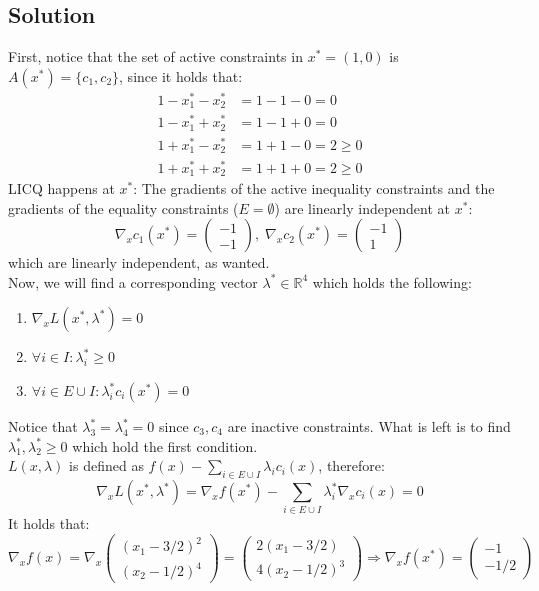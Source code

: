 \documentclass{article}
\begin{document}
\subsection*{Solution}
First, notice that the set of active constraints in $x^* = (1,0)$ is $A(x^*)=\{c_1 , c_2\}$, since it holds that:
\begin{align*}
    1-x^*_1 -x^*_2 &= 1-1-0 =0 \\ 1-x^*_1 +x^*_2 &= 1-1+0=0 \\ 1+x^*_1 -x^*_2 &= 1+1-0 =2\ge 0 \\ 1+x^*_1 +x^*_2 &= 1+1+0 =2\ge 0
\end{align*}
LICQ happens at $x^*$:
The gradients of the active inequality constraints and the gradients of the equality constraints ($E = \emptyset$) are linearly independent at $x^*$:
\[\nabla_x c_1(x^*) =
    \begin{pmatrix}
    -1 \\
    -1
    \end{pmatrix}, \;
    \nabla_x c_2(x^*) =
    \begin{pmatrix}
    -1 \\1\end{pmatrix}\]
which are linearly independent, as wanted.\\ 
Now, we will find a corresponding vector $\lambda^*\in\mathbb{R}^4$ which holds the following:
\begin{enumerate}
    \item $\nabla_x L(x^*, \lambda^*) = 0$
    \item $\forall i\in I: \lambda^*_i\geq 0$
    \item $\forall i\in E\cup I: \lambda^*_i c_i(x^*)= 0$
\end{enumerate}
Notice that $\lambda^*_3 =\lambda^*_4 =0$ since $c_3, c_4$ are inactive constraints. What is left is to find $\lambda^*_1, \lambda^*_2\geq 0$ which hold the first condition.\\
$L(x,\lambda)$ is defined as $f(x) - \sum_{i\in E\cup I}{\lambda_i c_i(x)}$, therefore: \[\nabla_x L(x^*, \lambda^*) = \nabla_x f(x^*) -\sum_{i\in E\cup I}{\lambda^*_i \nabla_x c_i(x)}=0\]
It holds that:
\[\nabla_x f(x) =\nabla_x\begin{pmatrix}(x_1 - 3/2)^2\\(x_2 - 1/2)^4\end{pmatrix}=\begin{pmatrix}2(x_1 - 3/2)\\4(x_2 - 1/2)^3\end{pmatrix}\Rightarrow \nabla_x f(x^*)=\begin{pmatrix}-1\\ -1/2\end{pmatrix}\]
\end{document}
